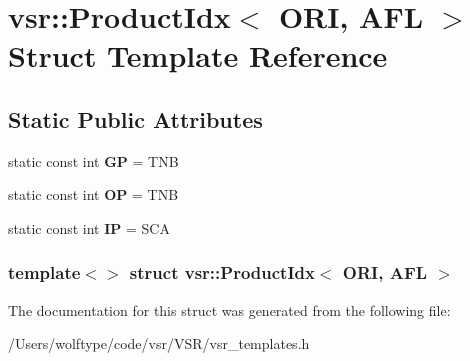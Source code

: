 \hypertarget{structvsr_1_1_product_idx_3_01_o_r_i_00_01_a_f_l_01_4}{\section{vsr\-:\-:Product\-Idx$<$ O\-R\-I, A\-F\-L $>$ Struct Template Reference}
\label{structvsr_1_1_product_idx_3_01_o_r_i_00_01_a_f_l_01_4}
}
\subsection*{Static Public Attributes}
\begin{DoxyCompactItemize}
\item 
\hypertarget{structvsr_1_1_product_idx_3_01_o_r_i_00_01_a_f_l_01_4_aaeb0794966adc83d88b8c1f8b135fe23}{static const int {\bfseries G\-P} = T\-N\-B}\label{structvsr_1_1_product_idx_3_01_o_r_i_00_01_a_f_l_01_4_aaeb0794966adc83d88b8c1f8b135fe23}

\item 
\hypertarget{structvsr_1_1_product_idx_3_01_o_r_i_00_01_a_f_l_01_4_ac8f24789cc012133154b58c74a17edc5}{static const int {\bfseries O\-P} = T\-N\-B}\label{structvsr_1_1_product_idx_3_01_o_r_i_00_01_a_f_l_01_4_ac8f24789cc012133154b58c74a17edc5}

\item 
\hypertarget{structvsr_1_1_product_idx_3_01_o_r_i_00_01_a_f_l_01_4_a92f52126a12197386d2183d6aa6cdae3}{static const int {\bfseries I\-P} = S\-C\-A}\label{structvsr_1_1_product_idx_3_01_o_r_i_00_01_a_f_l_01_4_a92f52126a12197386d2183d6aa6cdae3}

\end{DoxyCompactItemize}
\subsubsection*{template$<$$>$ struct vsr\-::\-Product\-Idx$<$ O\-R\-I, A\-F\-L $>$}



The documentation for this struct was generated from the following file\-:\begin{DoxyCompactItemize}
\item 
/\-Users/wolftype/code/vsr/\-V\-S\-R/vsr\-\_\-templates.\-h\end{DoxyCompactItemize}
